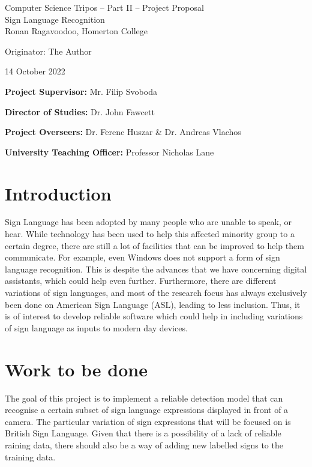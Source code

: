\documentclass[12pt,a4paper,twoside]{article}
\begin{document}
%

\begin{center}
    \Large
    Computer Science Tripos -- Part II -- Project Proposal\\[4mm]
    \LARGE
    Sign Language Recognition\\[4mm]

    \large
    Ronan Ragavoodoo, Homerton College

    Originator: The Author

    14 October 2022
\end{center}

\vspace{5mm}

\textbf{Project Supervisor:} Mr. Filip Svoboda

\textbf{Director of Studies:} Dr. John Fawcett

\textbf{Project Overseers:} Dr. Ferenc Huszar \& Dr. Andreas Vlachos

\textbf{University Teaching Officer:} Professor Nicholas Lane


\section*{Introduction}

Sign Language has been adopted by many people who are unable to speak, or hear. While technology has been used to help this affected minority group to a certain degree, there are still a lot of facilities that can be improved to help them communicate. For example, even Windows does not support a form of sign language recognition. This is  despite the advances that we have concerning digital assistants, which could help even further. Furthermore, there are different variations of sign languages, and most of the research focus has always exclusively been done on American Sign Language (ASL), leading to less inclusion. Thus, it is of interest to develop reliable software which could help in including variations of sign language as inputs to modern day devices.


\section*{Work to be done}

The goal of this project is to implement a reliable detection model that can recognise a certain subset of sign language expressions displayed in front of a camera. The particular variation of sign expressions that will be focused on is British Sign Language. Given that there is a possibility of a lack of reliable raining data, there should also be a way of adding new labelled signs to the training data.
\end{document}
